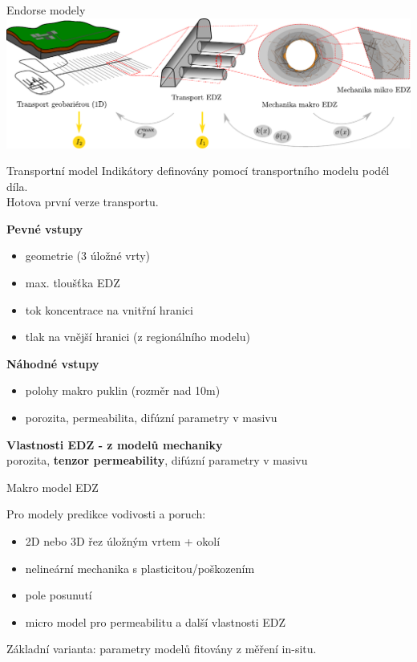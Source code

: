\documentclass[10pt,xcolor={usenames,dvipsnames}]{beamer} %
\begin{document}
\begin{frame}{Endorse modely}
 \includegraphics[width=\textwidth]{graphics/main_scheme.pdf}
\end{frame}


\begin{frame}{Transportní model}
Indikátory definovány pomocí transportního modelu podél díla.\\
Hotova první verze transportu.

\vspace{2ex}
{\bf Pevné vstupy}
\begin{itemize}
  \item geometrie (3 úložné vrty)
  \item max. tloušťka EDZ
  \item tok koncentrace na vnitřní hranici
  \item tlak na vnější hranici (z regionálního modelu)
\end{itemize}

\vspace{2ex}
{\bf Náhodné vstupy}
\begin{itemize}
 \item polohy makro puklin (rozměr nad 10m)
 \item porozita, permeabilita, difúzní parametry v masivu
\end{itemize}

\vspace{2ex}
{\bf Vlastnosti EDZ - z modelů mechaniky}\\
porozita, {\bf tenzor permeability}, difúzní parametry v masivu
\end{frame}


\begin{frame}{Makro model EDZ}

Pro modely predikce vodivosti a poruch:
\begin{itemize}
 \item 2D nebo 3D řez úložným vrtem + okolí
 \item nelineární mechanika s plasticitou/poškozením
 \item pole posunutí
 \item micro model pro permeabilitu a další vlastnosti EDZ
\end{itemize}

Základní varianta: parametry modelů fitovány z měření in-situ.
\end{frame}
\end{document}
